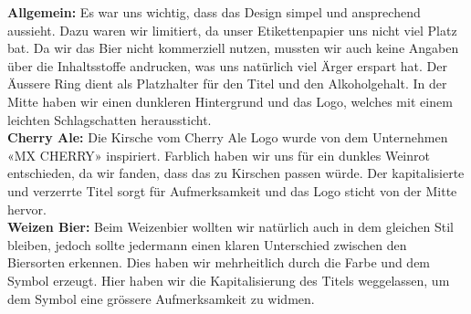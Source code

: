 \textbf{Allgemein:}
Es war uns wichtig, dass das Design simpel und ansprechend aussieht. Dazu waren wir limitiert, da unser Etikettenpapier uns nicht viel Platz bat. Da wir das Bier nicht kommerziell nutzen, mussten wir auch keine Angaben über die Inhaltsstoffe andrucken, was uns natürlich viel Ärger erspart hat. Der Äussere Ring dient als Platzhalter für den Titel und den Alkoholgehalt. In der Mitte haben wir einen dunkleren Hintergrund und das Logo, welches mit einem leichten Schlagschatten heraussticht.
\\
\textbf{Cherry Ale:}
Die Kirsche vom Cherry Ale Logo wurde von dem Unternehmen «MX CHERRY» \cite{Cherry}  inspiriert. Farblich haben wir uns für ein dunkles Weinrot entschieden, da wir fanden, dass das zu Kirschen passen würde. Der kapitalisierte und verzerrte Titel sorgt für Aufmerksamkeit und das Logo sticht von der Mitte hervor.
\\
\textbf{Weizen Bier:}
Beim Weizenbier wollten wir natürlich auch in dem gleichen Stil bleiben, jedoch sollte jedermann einen klaren Unterschied zwischen den Biersorten erkennen. Dies haben wir mehrheitlich durch die Farbe und dem Symbol erzeugt. Hier haben wir die Kapitalisierung des Titels weggelassen, um dem Symbol eine grössere Aufmerksamkeit zu widmen. 
